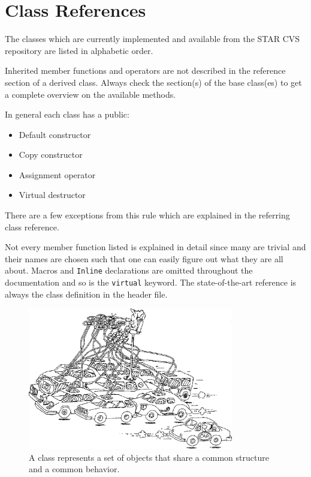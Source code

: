 \documentclass[twoside]{article}
\begin{document}
\section{Class References} %
The classes which are currently implemented and available from the
STAR CVS repository are listed in alphabetic order.

Inherited member functions and operators are not described in the
reference section of a derived class. Always check the section(s) of
the base class(es) to get a complete overview on the available
methods.

In general each class has a public:
\begin{itemize}
\item Default constructor
\item Copy constructor
\item Assignment operator
\item Virtual destructor
\end{itemize}
There are a few exceptions from this rule which are explained in the
referring class reference.

Not every member function listed is explained in detail since many are
trivial and their names are chosen such that one can easily figure out
what they are all about.  Macros and \texttt{Inline} declarations are
omitted throughout the documentation and so is the \texttt{virtual}
keyword.  The state-of-the-art reference is always the class
definition in the header file.
\begin{figure}[htb]
    \begin{center}
        \includegraphics[width=0.8\textwidth]{cartoon8.eps}
        \caption{A class represents a set of objects that share
            a common structure and a common behavior.}
    \end{center}
\end{figure}
\clearpage
\end{document}
